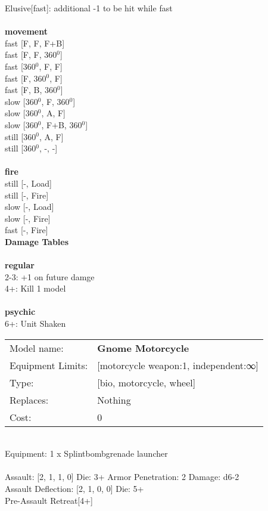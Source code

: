 \noindent Elusive[fast]: additional -1 to be hit while fast\\ 


\ \\ {\bf movement } \\
fast [F, F, F+B] \\
fast [F, F, 360$^0$] \\
fast [360$^0$, F, F] \\
fast [F, 360$^0$, F] \\
fast [F, B, 360$^0$] \\
slow [360$^0$, F, 360$^0$] \\
slow [360$^0$, A, F] \\
slow [360$^0$, F+B, 360$^0$] \\
still [360$^0$, A, F] \\
still [360$^0$, -, -] \\
\ \\ {\bf fire } \\
still [-, Load] \\
still [-, Fire] \\
slow [-, Load] \\
slow [-, Fire] \\
fast [-, Fire] \\


{\bf Damage Tables} \\
\ \\ {\bf regular } \\
2-3: +1 on future damge \\
4+: Kill 1 model \\
\ \\ {\bf psychic } \\
6+: Unit Shaken \\


\noindent
\begin{tabular}{ll}
Model name: &{\bf Gnome Motorcycle } \\
Equipment Limits: &[motorcycle weapon:1, independent:∞] \\
Type: &[bio, motorcycle, wheel] \\
Replaces: &Nothing \\
Cost: & 0\\
\end{tabular}
\ \\
Equipment: 1 x Splintbombgrenade launcher \\
\ \\
Assault: [2, 1, 1, 0] Die: 3+ Armor Penetration: 2 Damage: d6-2 \\
Assault Deflection: [2, 1, 0, 0] Die: 5+\\
\indent Pre-Assault Retreat[4+]\\ 
 
